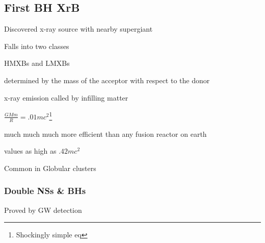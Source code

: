 \documentclass{article}
\begin{document}
\subsection{First BH XrB}
\begin{list}{-}{}
\item Discovered x-ray source with nearby supergiant
\item Falls into two classes
\item HMXBs and LMXBs
\item determined by the mass of the acceptor with respect to the donor
\item x-ray emission called by infilling matter
\item \(\frac{GMm}{R} = .01mc^2\)\footnote{Shockingly simple eq}
\item much much much more efficient than any fusion reactor on earth
\item values as high as \(.42mc^2\)
\item Common in Globular clusters
\end{list}

\subsubsection{Double NSs \& BHs}
\begin{list}{-}{}
\item Proved by GW detection
\item 
\end{list}

\clearpage

\printglossaries
\end{document}
